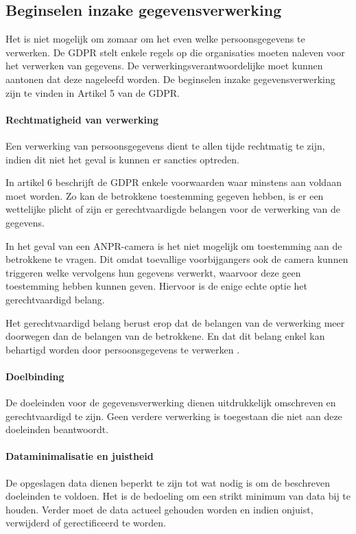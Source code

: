 \subsection{Beginselen inzake gegevensverwerking}
Het is niet mogelijk om zomaar om het even welke persoonsgegevens te verwerken. De GDPR stelt enkele regels op die organisaties moeten naleven voor het verwerken van gegevens. De verwerkingsverantwoordelijke moet kunnen aantonen dat deze nageleefd worden. De beginselen inzake gegevensverwerking zijn te vinden in Artikel 5 van de GDPR.

\paragraph{Rechtmatigheid van verwerking}
\label{rechtmatigheid-van-verwerking}
Een verwerking van persoonsgegevens dient te allen tijde rechtmatig te zijn, indien dit niet het geval is kunnen er sancties optreden.

In artikel 6 beschrijft de GDPR enkele voorwaarden waar minstens aan voldaan moet worden. Zo kan de betrokkene toestemming gegeven hebben, is er een wettelijke plicht of zijn er gerechtvaardigde belangen voor de verwerking van de gegevens.

In het geval van een ANPR-camera is het niet mogelijk om toestemming aan de betrokkene te vragen. Dit omdat toevallige voorbijgangers ook de camera kunnen triggeren welke vervolgens hun gegevens verwerkt, waarvoor deze geen toestemming hebben kunnen geven. Hiervoor is de enige echte optie het gerechtvaardigd belang.

Het gerechtvaardigd belang berust erop dat de belangen van de verwerking meer doorwegen dan de belangen van de betrokkene. En dat dit belang enkel kan behartigd worden door persoonsgegevens te verwerken \autocite{autoriteit2019gerechtvaardigd}.

\paragraph{Doelbinding}
De doeleinden voor de gegevensverwerking dienen uitdrukkelijk omschreven en gerechtvaardigd te zijn. Geen verdere verwerking is toegestaan die niet aan deze doeleinden beantwoordt.

\paragraph{Dataminimalisatie en juistheid}
De opgeslagen data dienen beperkt te zijn tot wat nodig is om de beschreven doeleinden te voldoen. Het is de bedoeling om een strikt minimum van data bij te houden. Verder moet de data actueel gehouden worden en indien onjuist, verwijderd of gerectificeerd te worden.

